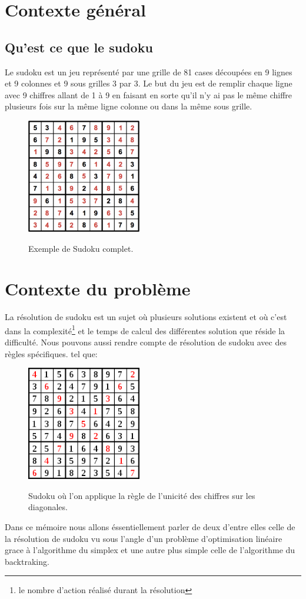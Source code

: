 
\hypertarget{contexte-general}{%
\section{Contexte général}\label{contexte-guxe9nuxe9ral}}
\subsection{Qu'est ce que le sudoku}

Le sudoku est un jeu représenté par une grille de 81 cases découpées en 9 lignes et 9 colonnes et 9 sous grilles 3 par 3.
Le but du jeu est de remplir chaque ligne avec 9 chiffres allant de 1 à 9 en faisant en sorte qu'il n'y ai pas le même chiffre plusieurs fois sur la même ligne colonne ou dans la même sous grille.

\begin{figure}[!h]
\centering
\includegraphics[width=5cm]{./images/Sudoku_Exemple.png}\label{Sudoku}
\caption{Exemple de Sudoku complet.}
\end{figure}

\hypertarget{Contexte du problème}{%
\section{Contexte du problème}\label{Contexte_du_probleme}}

La résolution de sudoku est un sujet où plusieurs solutions existent et où c'est dans la complexité\footnote{le nombre d'action réalisé durant la résolution} et le temps de calcul des différentes solution que réside la difficulté. Nous pouvons aussi rendre compte de résolution de sudoku avec des règles spécifiques.
\newline
tel que:

\begin{figure}[!h]
\centering
\includegraphics[width=5cm]{./images/Sudoku_Special.png}\label{Sudoku_Special}
\caption{Sudoku où l'on applique la règle de l'unicité des chiffres sur les diagonales.}
\end{figure}

Dans ce mémoire nous allons éssentiellement parler de deux d'entre elles celle de la résolution de sudoku vu sous l'angle d'un problème d'optimisation linéaire grace à l'algorithme du simplex et une autre plus simple celle de l'algorithme du backtraking.
